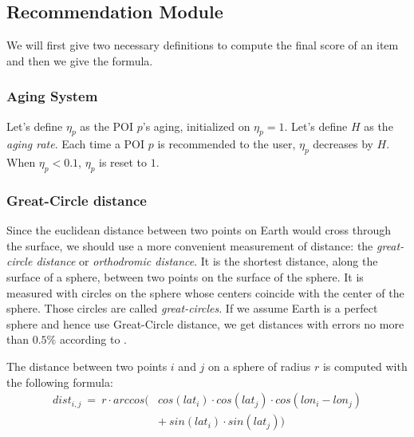 \subsection{Recommendation Module}

We will first give two necessary definitions to compute the final score of an item and then we give the formula.

\subsubsection{Aging System}

Let's define $\eta_p$ as the POI $p$'s aging, initialized on $\eta_p = 1$. Let's define $H$ as the \textit{aging rate}. Each time a POI $p$ is recommended to the user, $\eta_p$ decreases by $H$. When $\eta_p < 0.1$, $\eta_p$ is reset to $1$. 

\subsubsection{Great-Circle distance}
Since the euclidean distance between two points on Earth would cross through the surface, we should use a more convenient measurement of distance: the \textit{great-circle distance} or \textit{orthodromic distance}. It is the shortest distance, along the surface of a sphere, between two points on the surface of the sphere. It is measured with circles on the sphere whose centers coincide with the center of the sphere. Those circles are called \textit{great-circles}. If we assume Earth is a perfect sphere and hence use Great-Circle distance, we get distances with errors no more than $0.5\%$ according to \cite{1997admiralty}. 

The distance between two points $i$ and $j$ on a sphere of radius $r$ is computed with the following formula:
\begin{equation} \label{eq:gc-dist}
    \begin{split}
        \scriptstyle{dist_{i,j} \ = \ r \cdot arccos (} & \scriptstyle{cos(lat_i) \cdot cos(lat_j) \cdot cos(lon_i - lon_j)} \\
                                        & \scriptstyle{+ \ sin(lat_i) \cdot sin(lat_j) )}
    \end{split}
\end{equation}


